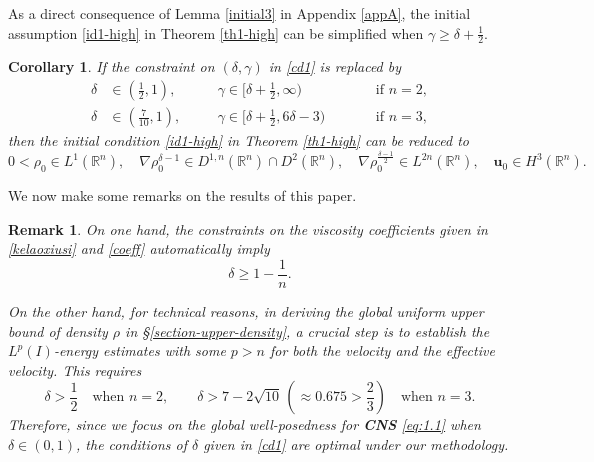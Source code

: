 \documentclass[11pt,reqno]{amsart}
\newtheorem{rk}{Remark}
\newtheorem{cor}{Corollary}[section]
\numberwithin{rk}{section}
\numberwithin{prop}{section}
\numberwithin{mydef}{section}
\numberwithin{lem}{section}
\numberwithin{equation}{section}
\numberwithin{thm}{section}
\begin{document}
As a direct consequence of Lemma \ref{initial3} in Appendix \ref{appA}, the initial assumption \eqref{id1-high} in Theorem \ref{th1-high} can be simplified when $\gamma\geq \delta+\frac{1}{2}$.
\begin{cor}
If the constraint on $(\delta,\gamma)$ in \eqref{cd1} is replaced by 
\begin{equation*} 
\begin{aligned}
\delta&\in (\frac{1}{2},1),\quad &&\gamma\in \big[\delta+\frac{1}{2},\infty\big) \ \quad &&&\text{if $n=2$},\\
\delta&\in (\frac{7}{10},1),\quad &&\gamma\in \big[\delta+\frac{1}{2},6\delta-3\big) \ \quad &&&\text{if $n=3$},    
\end{aligned}
\end{equation*}
then the initial condition \eqref{id1-high} in {\rm Theorem \ref{th1-high}} can be reduced to
\begin{equation*}
0<\rho_0\in L^1(\mathbb{R}^n),\quad \nabla \rho_0^{\delta-1}\in  D^{1,n}(\mathbb{R}^n)\cap D^{2}(\mathbb{R}^n),\quad \nabla\rho_0^\frac{\delta-1}{2}\in L^{2n}(\mathbb{R}^n),\quad\boldsymbol{u}_0 \in H^3(\mathbb{R}^n).   
\end{equation*}
\end{cor}







We now make some remarks on the results of this paper.
\begin{rk}
On one hand, the constraints on the viscosity coefficients  given in \eqref{kelaoxiusi} and \eqref{coeff} automatically imply
\begin{equation*}
\delta\geq 1-\frac{1}{n}.
\end{equation*}



On the other hand, for technical reasons, in deriving the global uniform upper bound of density $\rho$ in {\rm\S \ref{section-upper-density}}, a crucial step is to establish the $L^{p}(I)$-energy estimates with some $p>n$ for both the velocity and the effective velocity. This requires
\begin{equation}
\delta>\frac{1}{2}\quad \text{when $n=2$},\qquad \delta>7-2\sqrt{10}\,(\approx 0.675>\frac{2}{3})\quad \text{when $n=3$}.
\end{equation}
Therefore, since we focus on the global well-posedness for {\rm\textbf{CNS}} \eqref{eq:1.1} when $\delta\in (0,1)$, the conditions of $\delta$ given in \eqref{cd1} are optimal under our methodology.
\end{rk}
\end{document}
